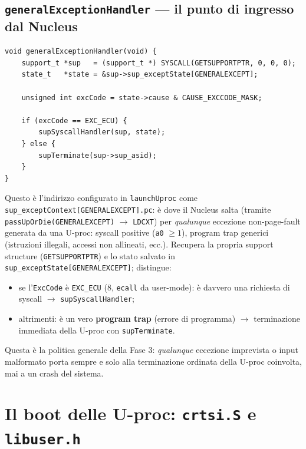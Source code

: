 \documentclass[11pt,a4paper]{article}
\newcommand{\code}[1]{\texttt{#1}}
\newcommand{\func}[1]{\textbf{\texttt{#1}}}
\begin{document}
\subsection{\func{generalExceptionHandler} --- il punto di ingresso dal Nucleus}
\begin{lstlisting}
void generalExceptionHandler(void) {
    support_t *sup   = (support_t *) SYSCALL(GETSUPPORTPTR, 0, 0, 0);
    state_t   *state = &sup->sup_exceptState[GENERALEXCEPT];

    unsigned int excCode = state->cause & CAUSE_EXCCODE_MASK;

    if (excCode == EXC_ECU) {
        supSyscallHandler(sup, state);
    } else {
        supTerminate(sup->sup_asid);
    }
}
\end{lstlisting}
Questo è l'indirizzo configurato in \code{launchUproc} come
\code{sup\_exceptContext[GENERALEXCEPT].pc}: è dove il Nucleus salta
(tramite \code{passUpOrDie(GENERALEXCEPT)} $\to$ \code{LDCXT}) per
\emph{qualunque} eccezione non-page-fault generata da una U-proc: syscall
positive (\code{a0} $\ge 1$), program trap generici (istruzioni illegali,
accessi non allineati, ecc.). Recupera la propria support structure
(\code{GETSUPPORTPTR}) e lo stato salvato in
\code{sup\_exceptState[GENERALEXCEPT]}; distingue:
\begin{itemize}
\item se l'\code{ExcCode} è \code{EXC\_ECU} (8, \code{ecall} da user-mode):
  è davvero una richiesta di syscall $\to$ \code{supSyscallHandler};
\item altrimenti: è un vero \textbf{program trap} (errore di programma) $\to$
  terminazione immediata della U-proc con \code{supTerminate}.
\end{itemize}
Questa è la politica generale della Fase 3: \emph{qualunque} eccezione
imprevista o input malformato porta sempre e solo alla terminazione
ordinata della U-proc coinvolta, mai a un crash del sistema.

\section{Il boot delle U-proc: \code{crtsi.S} e \code{libuser.h}}
\end{document}
